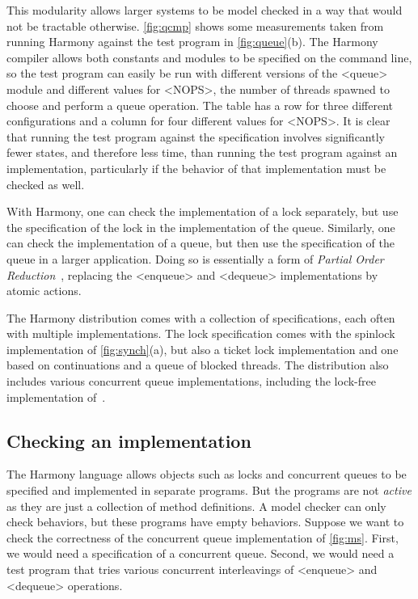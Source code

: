 \documentclass[twocolumn]{article}
\begin{document}
This modularity allows larger systems to be model checked in a way
that would not be tractable otherwise.
\autoref{fig:qcmp} shows some measurements taken from running
Harmony against the test program in \autoref{fig:queue}(b).
The Harmony compiler allows both constants and modules to be
specified on the command line, so the test program can easily be
run with different versions of the <{queue}> module and different
values for <{NOPS}>, the number of threads spawned to choose and
perform a queue operation.  The table has a row for three different
configurations and a column for four different values for <{NOPS}>.
It is clear that running the test program against the specification
involves significantly fewer states, and therefore less time, than
running the test program against an implementation, particularly
if the behavior of that implementation must be checked as well.

With Harmony, one can check the implementation of a lock separately,
but use the specification of the lock in the implementation of the
queue.  Similarly, one can check the implementation of a queue,
but then use the specification of the queue in a larger application.
Doing so is essentially a form of \emph{Partial Order Reduction}~\cite{Val91},
replacing the <{enqueue}> and <{dequeue}> implementations
by atomic actions.

The Harmony distribution comes with a collection of specifications,
each often with multiple implementations.  The lock specification
comes with the spinlock implementation of \autoref{fig:synch}(a), but
also a ticket lock implementation and one based on continuations and
a queue of blocked threads.  The distribution also includes various concurrent
queue implementations, including the lock-free implementation
of~\cite{MS96}.

\subsection{Checking an implementation}

The Harmony language allows objects such as locks and concurrent queues
to be specified and implemented in separate programs.  But the programs
are not \emph{active} as they are just a collection of method definitions.
A model checker can only check behaviors, but these programs have empty
behaviors.
Suppose we want to check the correctness of the concurrent queue
implementation of \autoref{fig:ms}.  First, we would need a specification
of a concurrent queue.  Second, we would need a test program that tries
various concurrent interleavings of <{enqueue}> and <{dequeue}> operations.
\end{document}
